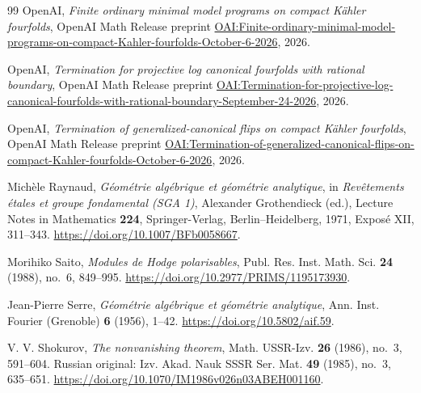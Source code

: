 \documentclass[11pt]{amsart}
\theoremstyle{definition}
\theoremstyle{remark}
\numberwithin{equation}{section}
\begin{document}
\begin{thebibliography}{99}
OpenAI,
\emph{Finite ordinary minimal model programs on compact K\"ahler fourfolds},
OpenAI Math Release preprint
\href{https://github.com/openai/math/blob/main/preprints/Finite-ordinary-minimal-model-programs-on-compact-Kahler-fourfolds-October-6-2026/paper.pdf}{OAI:Finite-ordinary-minimal-model-programs-on-compact-Kahler-fourfolds-October-6-2026},
2026.

OpenAI,
\emph{Termination for projective log canonical fourfolds with rational boundary},
OpenAI Math Release preprint
\href{https://github.com/openai/math/blob/main/preprints/Termination-for-projective-log-canonical-fourfolds-with-rational-boundary-September-24-2026/paper.pdf}{OAI:Termination-for-projective-log-canonical-fourfolds-with-rational-boundary-September-24-2026},
2026.

OpenAI,
\emph{Termination of generalized-canonical flips on compact K\"ahler fourfolds},
OpenAI Math Release preprint
\href{https://github.com/openai/math/blob/main/preprints/Termination-of-generalized-canonical-flips-on-compact-Kahler-fourfolds-October-6-2026/termination-generalized-terminal-flips-compact-kahler-fourfolds.pdf}{OAI:Termination-of-generalized-canonical-flips-on-compact-Kahler-fourfolds-October-6-2026},
2026.

Mich\`ele Raynaud,
\emph{G\'eom\'etrie alg\'ebrique et g\'eom\'etrie analytique},
in \emph{Rev\^etements \'etales et groupe fondamental (SGA 1)},
Alexander Grothendieck (ed.), Lecture Notes in Mathematics \textbf{224},
Springer-Verlag, Berlin--Heidelberg, 1971, Expos\'e XII, 311--343.
\url{https://doi.org/10.1007/BFb0058667}.

Morihiko Saito,
\emph{Modules de Hodge polarisables},
Publ. Res. Inst. Math. Sci. \textbf{24} (1988), no.~6, 849--995.
\url{https://doi.org/10.2977/PRIMS/1195173930}.

Jean-Pierre Serre,
\emph{G\'eom\'etrie alg\'ebrique et g\'eom\'etrie analytique},
Ann. Inst. Fourier (Grenoble) \textbf{6} (1956), 1--42.
\url{https://doi.org/10.5802/aif.59}.

V. V. Shokurov,
\emph{The nonvanishing theorem},
Math. USSR-Izv. \textbf{26} (1986), no.~3, 591--604.
Russian original: Izv. Akad. Nauk SSSR Ser. Mat. \textbf{49} (1985),
no.~3, 635--651.
\url{https://doi.org/10.1070/IM1986v026n03ABEH001160}.

\end{thebibliography}
\end{document}

